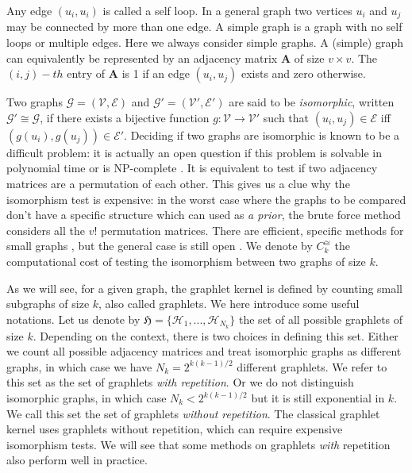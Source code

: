Any edge $(u_i, u_i)$ is called a self loop. In a general graph two vertices $u_i$ and $u_j$ may be connected by more than
one edge. A simple graph is a graph with no self loops or multiple edges. Here we always consider simple graphs.
A (simple) graph can equivalently be represented by an adjacency matrix $\mathbf{A}$ of size $v \times v$. The $(i,j)-th$ entry of $\mathbf{A}$ is 1 if an edge $(u_i, u_j)$ exists and zero otherwise.

Two graphs $\mathcal{G}=(\mathcal{V},\mathcal{E})$ and $\mathcal{G'}=(\mathcal{V'},\mathcal{E'})$ are said to be \emph{isomorphic}, written $\mathcal{G}'\cong \mathcal{G}$, if there exists a bijective function $g:\mathcal{V}\xrightarrow{} \mathcal{V}'$ such that $(u_i,u_j)\in \mathcal{E}$ iff $(g(u_i),g(u_j))\in \mathcal{E}'$. Deciding if two graphs are isomorphic is known to be a difficult problem: it is actually an open question if this problem is solvable in polynomial time or is NP-complete \citep{isomorphism_np}. It is equivalent to test if two adjacency matrices are a permutation of each other. This gives us a clue why the isomorphism test is expensive: in the worst case where the graphs to be compared don't have a specific structure which can used as \emph{a prior}, the brute force method considers all the $v!$ permutation matrices. There are efficient, specific methods for small graphs \citep{graphlet_kernel}, but the general case is still open \citep{isomorphism_np}. We denote by $C^{\cong}_k$ the computational cost of testing the isomorphism between two graphs of size $k$. 

As we will see, for a given graph, the graphlet kernel is defined by counting small subgraphs of size $k$, also called graphlets. We here introduce some useful notations. Let us denote by $\mathfrak{H}=\{\mathcal{H}_1,..., \mathcal{H}_{N_k}\}$ the set of all possible graphlets of size $k$. Depending on the context, there is two choices in defining this set. Either we count all possible adjacency matrices and treat isomorphic graphs as different graphs, in which case we have $N_k=2^{k(k-1)/2}$ different graphlets. We refer to this set as the set of graphlets \emph{with repetition}. Or we do not distinguish isomorphic graphs, in which case $N_k<2^{k(k-1)/2}$ but it is still exponential in $k$. We call this set the set of graphlets \emph{without repetition}. The classical graphlet kernel uses graphlets without repetition, which can require expensive isomorphism tests. We will see that some methods on graphlets \emph{with} repetition also perform well in practice.

